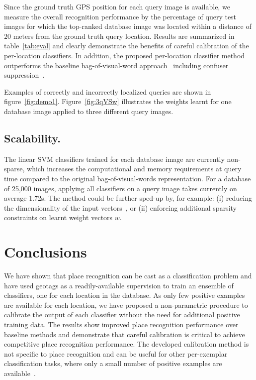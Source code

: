       

      Since the ground truth GPS position for each query image is available, we measure the overall recognition performance by the percentage of query test images for which the top-ranked database image was located within a distance of $20$ meters from the ground truth query location.  Results are summarized in table~\ref{tab:eval} and clearly demonstrate the benefits of  careful calibration of the per-location classifiers. In addition, the proposed per-location classifier method outperforms the baseline bag-of-visual-word approach~\cite{Philbin07} including confuser suppression~\cite{Knopp2010}.

      Examples of correctly and incorrectly localized queries are shown in figure~\ref{fig:demo1}. Figure~\ref{fig:3qVSw} illustrates the weights learnt for one database image applied
      to three different query images.

   \subsection{Scalability.}
      The linear SVM classifiers trained for each database image are currently non-sparse,
      which increases the computational and memory requirements
      at query time compared to the original bag-of-visual-words representation.
      For a database of 25,000 images, applying all classifiers on a query image takes currently on average 1.72s. The method could be further sped-up by, for example: (i) reducing the dimensionality of the input vectors~\cite{Jegou12}, or (ii) enforcing additional sparsity constraints on learnt weight vectors $w$.

   
\section{Conclusions}
   We have shown that place recognition can be cast as a classification problem and have used geotags as a readily-available supervision to train an ensemble of classifiers, one for each location in the database. As only few positive examples are available for each location, we have proposed a non-parametric procedure to calibrate the output of each classifier without the need for additional positive training data. The results show improved place recognition performance over baseline methods and demonstrate that careful calibration is critical to achieve competitive place recognition performance. The developed calibration method is not specific to place recognition and can be useful for other per-exemplar classification tasks, where only a small number of positive examples are available~\cite{Malisiewicz11}.

